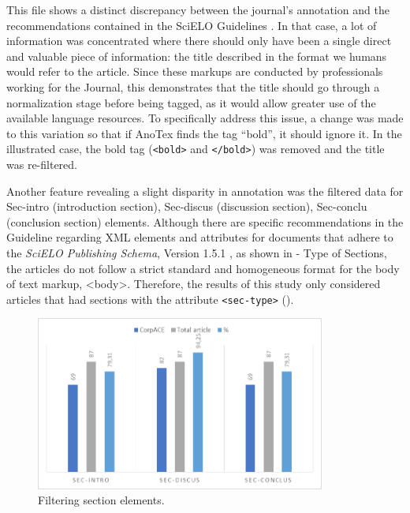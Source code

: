 \documentclass[english]{textolivre}
\begin{document}
This file shows a distinct discrepancy between the journal’s annotation and the recommendations contained in the  SciELO Guidelines \citeyear{Scielo}. In that case, a lot of information was concentrated where there should only have been a single direct and valuable piece of information: the title described in the format we humans would refer to the article. Since these markups are conducted by professionals working for the Journal, this demonstrates that the title should go through a normalization stage before being tagged, as it would allow greater use of the available language resources. To specifically address this issue, a change was made to this variation so that if AnoTex finds the tag “bold”, it should ignore it. In the illustrated case, the bold tag (\texttt{<bold>} and \texttt{</bold>}) was removed and the title was re-filtered.

Another feature revealing a slight disparity in annotation was the filtered data for Sec-intro (introduction section), Sec-discus (discussion section), Sec-conclu (conclusion section) elements. Although there are specific recommendations in the Guideline regarding XML elements and attributes for documents that adhere to the \textit{SciELO Publishing Schema}, Version 1.5.1 \citeyear{Scielo}, as shown in  - Type of Sections, the articles do not follow a strict standard and homogeneous format for the body of text markup, <body>. Therefore, the results of this study only considered articles that had sections with the attribute \texttt{<sec-type>} ().

\begin{figure}[htbp]
 \centering
 \includegraphics[width=0.85\textwidth]{Fig12.png}
 \caption{Filtering section elements.}
 \label{fig-12}
\end{figure}
\end{document}
